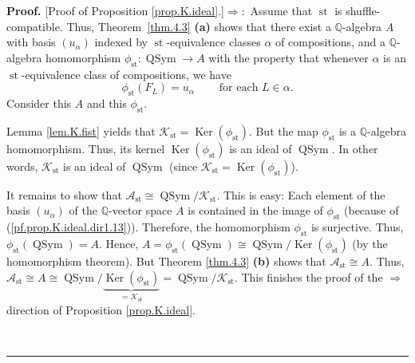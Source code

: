 \documentclass[numbers=enddot,12pt,final,onecolumn,notitlepage]{scrartcl}%
\theoremstyle{definition}
\newenvironment{proof}[1][Proof]{\noindent\textbf{#1.} }{\ \rule{0.5em}{0.5em}}
\begin{document}
\begin{proof}
[Proof of Proposition \ref{prop.K.ideal}.]$\Longrightarrow:$ Assume that
$\operatorname*{st}$ is shuffle-compatible. Thus, Theorem~\ref{thm.4.3}
\textbf{(a)} shows that there exist a $\mathbb{Q}$-algebra $A$ with basis
$\left(  u_{\alpha}\right)  $ indexed by $\operatorname*{st}$-equivalence
classes $\alpha$ of compositions, and a $\mathbb{Q}$-algebra homomorphism
$\phi_{\operatorname*{st}}:\operatorname*{QSym}\rightarrow A$ with the
property that whenever $\alpha$ is an $\operatorname*{st}$-equivalence class
of compositions, we have%
\begin{equation}
\phi_{\operatorname*{st}}\left(  F_{L}\right)  =u_{\alpha}%
\ \ \ \ \ \ \ \ \ \ \text{for each }L\in\alpha.
\label{pf.prop.K.ideal.dir1.13}%
\end{equation}
Consider this $A$ and this $\phi_{\operatorname*{st}}$.

Lemma \ref{lem.K.fist} yields that $\mathcal{K}_{\operatorname*{st}%
}=\operatorname*{Ker}\left(  \phi_{\operatorname*{st}}\right)  $. But the map
$\phi_{\operatorname*{st}}$ is a $\mathbb{Q}$-algebra homomorphism. Thus, its
kernel $\operatorname*{Ker}\left(  \phi_{\operatorname*{st}}\right)  $ is an
ideal of $\operatorname*{QSym}$. In other words, $\mathcal{K}%
_{\operatorname*{st}}$ is an ideal of $\operatorname*{QSym}$ (since
$\mathcal{K}_{\operatorname*{st}}=\operatorname*{Ker}\left(  \phi
_{\operatorname*{st}}\right)  $).

It remains to show that $\mathcal{A}_{\operatorname*{st}}\cong%
\operatorname*{QSym}/\mathcal{K}_{\operatorname*{st}}$. This is easy: Each
element of the basis $\left(  u_{\alpha}\right)  $ of the $\mathbb{Q}$-vector
space $A$ is contained in the image of $\phi_{\operatorname*{st}}$ (because of
(\ref{pf.prop.K.ideal.dir1.13})). Therefore, the homomorphism $\phi
_{\operatorname*{st}}$ is surjective. Thus, $\phi_{\operatorname*{st}}\left(
\operatorname*{QSym}\right)  =A$. Hence, $A=\phi_{\operatorname*{st}}\left(
\operatorname*{QSym}\right)  \cong\operatorname*{QSym}/\operatorname*{Ker}%
\left(  \phi_{\operatorname*{st}}\right)  $ (by the homomorphism theorem). But
Theorem \ref{thm.4.3} \textbf{(b)} shows that $\mathcal{A}_{\operatorname*{st}%
}\cong A$. Thus, $\mathcal{A}_{\operatorname*{st}}\cong A\cong%
\operatorname*{QSym}/\underbrace{\operatorname*{Ker}\left(  \phi
_{\operatorname*{st}}\right)  }_{=\mathcal{K}_{\operatorname*{st}}%
}=\operatorname*{QSym}/\mathcal{K}_{\operatorname*{st}}$. This finishes the
proof of the $\Longrightarrow$ direction of Proposition \ref{prop.K.ideal}.


\end{proof}
\end{document}
